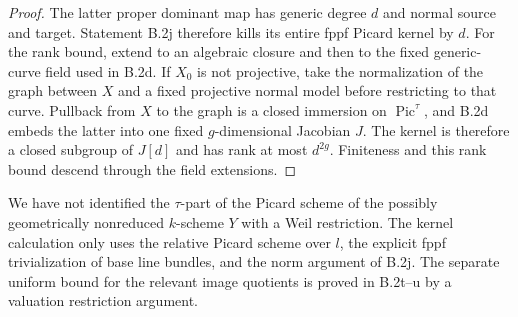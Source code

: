 \begin{proof}
The latter proper dominant map has generic degree $d$ and normal
source and target.  Statement B.2j therefore kills its entire
fppf Picard kernel by $d$.  For the rank bound, extend to an
algebraic closure and then to the fixed generic-curve field used
in B.2d.  If $X_0$ is not projective, take the normalization of
the graph between $X$ and a fixed projective normal model before
restricting to that curve.  Pullback from $X$ to the graph is a
closed immersion on $\operatorname{Pic}^{\tau}$, and B.2d embeds
the latter into one fixed $g$-dimensional Jacobian $J$.
The kernel is therefore a closed subgroup of $J[d]$ and has
rank at most $d^{2g}$.  Finiteness and this rank bound descend
through the field extensions.
\end{proof}

\begin{remark}
We have not identified the $\tau$-part of the Picard scheme of
the possibly geometrically nonreduced $k$-scheme $Y$ with a Weil
restriction.  The kernel calculation only uses the relative
Picard scheme over $l$, the explicit fppf trivialization of base
line bundles, and the norm argument of B.2j.  The separate
uniform bound for the relevant image quotients is proved in
B.2t--u by a valuation restriction argument.
\end{remark}


